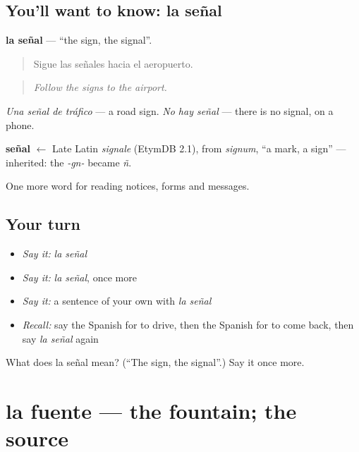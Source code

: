 \subsection*{You'll want to know: la señal}
\textbf{la señal} — \textquotedblleft{}the sign, the signal\textquotedblright{}.

\begin{quote}
Sigue las señales hacia el aeropuerto.
\end{quote}

\begin{quote}
\emph{Follow the signs to the airport.}
\end{quote}

\emph{Una señal de tráfico} — a road sign. \emph{No hay señal} — there is no signal, on a phone.

\begin{cousinweb}
\textbf{señal} $\leftarrow$ Late Latin \emph{signale} (EtymDB 2.1), from \emph{signum}, \textquotedblleft{}a mark, a sign\textquotedblright{} — inherited: the \emph{-gn-} became \emph{ñ}.
\end{cousinweb}

\begin{grammarlens}[title={What you've built}]
One more word for reading notices, forms and messages.
\end{grammarlens}

\subsection*{Your turn}
\begin{itemize}
\raggedright
  \item \emph{Say it:} \emph{la señal}
  \item \emph{Say it:} \emph{la señal}, once more
  \item \emph{Say it:} a sentence of your own with \emph{la señal}
  \item \emph{Recall:} say the Spanish for to drive, then the Spanish for to come back, then say \emph{la señal} again
\end{itemize}

\begin{tcolorbox}[breakable,colback=teal!4,colframe=teal!35!black,title={Before you move on}]
What does la señal mean? (\textquotedblleft{}The sign, the signal\textquotedblright{}.) Say it once more.
\end{tcolorbox}
\section[la fuente]{la fuente — the fountain; the source}

